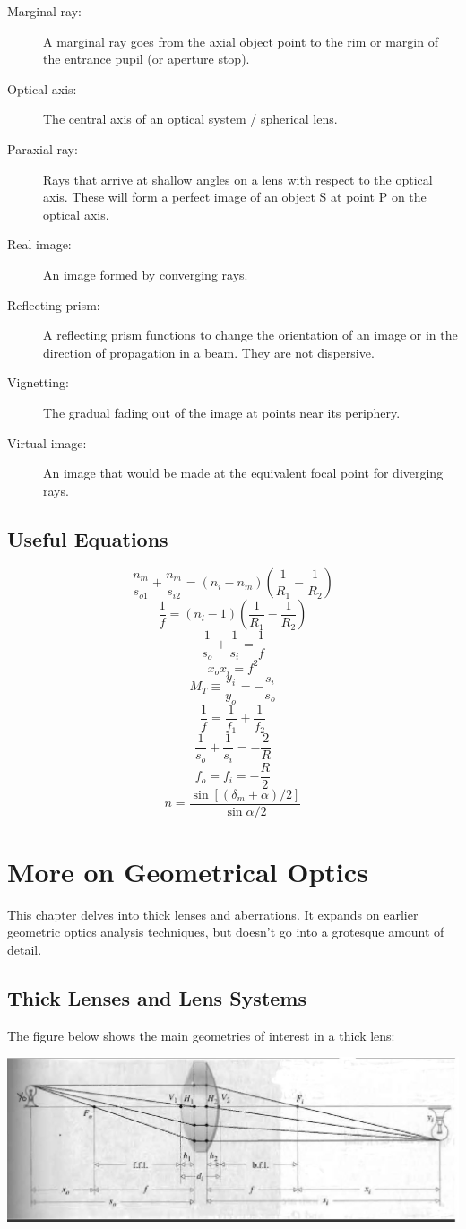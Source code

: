 \documentclass[12pt]{report}
\begin{document}
\begin{description}
\item[Marginal ray: ] A marginal ray goes from the axial object point to the rim or margin of the entrance pupil (or aperture stop). 
\item[Optical axis: ] The central axis of an optical system / spherical lens.
\item[Paraxial ray: ] Rays that arrive at shallow angles on a lens with respect to the optical axis. These will form a perfect image of an object S at point P on the optical axis. 
\item[Real image: ] An image formed by converging rays. 
\item[Reflecting prism: ] A reflecting prism functions to change the orientation of an image or in the direction of propagation in a beam. They are not dispersive. 
\item[Vignetting: ] The gradual fading out of the image at points near its periphery. 
\item[Virtual image: ] An image that would be made at the equivalent focal point for diverging rays. 

\end{description}

\section{Useful Equations}
\[\frac{n_m}{s_{o1}}+\frac{n_m}{s_{i2}} = (n_i-n_m)\left(\frac{1}{R_1}-\frac{1}{R_2}\right)\]
\[\frac{1}{f} = (n_l - 1)\left(\frac{1}{R_1}-\frac{1}{R_2}\right)\]
\[\frac{1}{s_o}+\frac{1}{s_i} = \frac{1}{f}\]
\[x_ox_i = f^2\]
\[M_T \equiv \frac{y_i}{y_o} = -\frac{s_i}{s_o}\]
\[\frac{1}{f} = \frac{1}{f_1}+\frac{1}{f_2}\]
\[\frac{1}{s_o}+\frac{1}{s_i} = -\frac{2}{R}\]
\[f_o = f_i = -\frac{R}{2} \]
\[n = \frac{\sin [(\delta_m+\alpha)/2]}{\sin \alpha/2}\]


\chapter{More on Geometrical Optics}
This chapter delves into thick lenses and aberrations. It expands on earlier geometric optics analysis techniques, but doesn't go into a grotesque amount of detail. 
\section{Thick Lenses and Lens Systems}
The figure below shows the main geometries of interest in a thick lens:

\includegraphics[scale=.35]{ThickLensGeometry.jpg}
\end{document}

